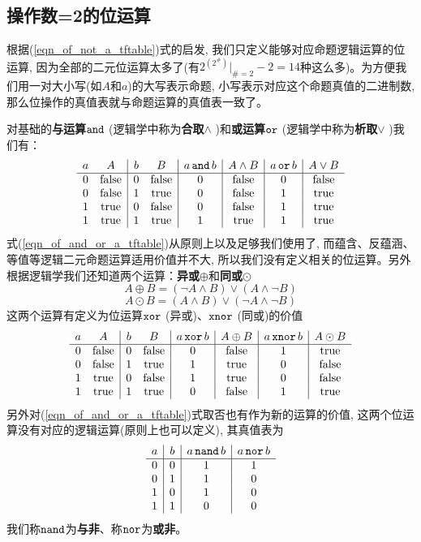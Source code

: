 \subsection*{操作数=2的位运算}
\par 根据(\ref{eqn_of_not_a_tftable})式的启发, 我们只定义能够对应命题逻辑运算的位运算, 因为全部的二元位运算太多了(有$2^{(2^\#)}|_{\#=2}-2=14$种这么多)。为方便我们用一对大小写(如$A$和$a$)的大写表示命题, 小写表示对应这个命题真值的二进制数, 那么位操作的真值表就与命题运算的真值表一致了。
\par 对基础的\textbf{与运算$\operatorname{\texttt{and}}$} (逻辑学中称为\textbf{合取$\land$} )和\textbf{或运算$\operatorname{\texttt{or}}$} (逻辑学中称为\textbf{析取$\lor$} )我们有：
\begin{equation}\label{eqn_of_and_or_a_tftable}
    \begin{array}{cc|cc|c|c|c|c}
        a&A&b&B&a\operatorname{\texttt{and}} b&A\land B&a\operatorname{\texttt{or}} b&A\lor B\\
        \hline
        0&\rm false&0&\rm false&0&\rm false&0&\rm false\\
        0&\rm false&1&\rm true&0&\rm false&1&\rm true\\
        1&\rm true&0&\rm false&0&\rm false&1&\rm true\\
        1&\rm true&1&\rm true&1&\rm true&1&\rm true
    \end{array}
\end{equation}
式(\ref{eqn_of_and_or_a_tftable})从原则上以及足够我们使用了, 而蕴含、反蕴涵、等值等逻辑二元命题运算适用价值并不大, 所以我们没有定义相关的位运算。另外根据逻辑学我们还知道两个运算：\textbf{异或$\oplus$}和\textbf{同或$\odot$}
$$A\oplus B=(\lnot A\land B)\lor(A\land\lnot B)$$
$$A\odot B=(A\land B)\lor(\lnot A\land\lnot B)$$
这两个运算有定义为位运算$\operatorname{\texttt{xor}}$ (异或)、$\operatorname{\texttt{xnor}}$ (同或)的价值
\begin{equation}\label{eqn_of_xor_xnor__a_tftable}
    \begin{array}{cc|cc|c|c|c|c}
        a&A&b&B&a\operatorname{\texttt{xor}} b&A\oplus B&a\operatorname{\texttt{xnor}} b&A\odot B\\
        \hline
        0&\rm false&0&\rm false&0&\rm false&1&\rm true\\
        0&\rm false&1&\rm true&1&\rm true&0&\rm false\\
        1&\rm true&0&\rm false&1&\rm true&0&\rm false\\
        1&\rm true&1&\rm true&0&\rm false&1&\rm true
    \end{array}
\end{equation}
另外对(\ref{eqn_of_and_or_a_tftable})式取否也有作为新的运算的价值, 这两个位运算没有对应的逻辑运算(原则上也可以定义), 其真值表为
\begin{equation}\label{eqn_of_nor_nand__a_tftable}
    \begin{array}{c|c|c|c}
        a&b&a\operatorname{\texttt{nand}} b&a\operatorname{\texttt{nor}} b\\
        \hline
        0&0&1&1\\
        0&1&1&0\\
        1&0&1&0\\
        1&1&0&0
    \end{array}
\end{equation}
我们称$\operatorname{\texttt{nand}}$为\textbf{与非}、称$\operatorname{\texttt{nor}}$为\textbf{或非}。
